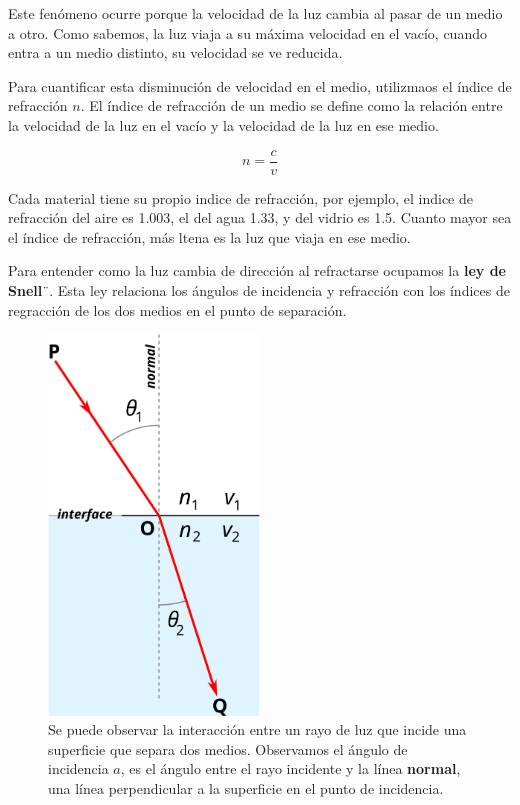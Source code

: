 Este fenómeno ocurre porque la velocidad de la luz cambia al pasar de un medio a otro. Como sabemos, la luz viaja a su máxima velocidad en el vacío, cuando entra a un medio distinto, su velocidad se ve reducida. 

Para cuantificar esta disminución de velocidad en el medio, utilizmaos el índice de refracción $n$. El índice de refracción de un medio se define como la relación entre la velocidad de la luz en el vacío y la velocidad de la luz en ese medio.

\begin{equation}
	n = \frac{c}{v}
	\label{eq:indice_refraccion}
\end{equation}

Cada material tiene su propio indice de refracción, por ejemplo, el indice de refracción del aire es 1.003, el del agua 1.33, y del vidrio es 1.5. Cuanto mayor sea el índice de refracción, más ltena es la luz que viaja en ese medio. 

Para entender como la luz cambia de dirección al refractarse ocupamos la \textbf{ley de Snell}¨. Esta ley relaciona los ángulos de incidencia y refracción con los índices de regracción de los dos medios en el punto de separación. 

\begin{figure}[ht]
	\centering
	\includegraphics[width=0.5\textwidth]{images/Snells_law2.png}
	\caption{Se puede observar la interacción entre un rayo de luz que incide una superficie que separa dos medios. Observamos el ángulo de incidencia $a$, es el ángulo entre el rayo incidente y la línea \textbf{normal}, una línea perpendicular a la superficie en el punto de incidencia. }
	\label{fig:snell_law}
\end{figure}

